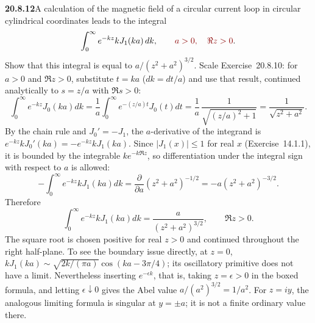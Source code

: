 \par\bigskip
\noindent\textbf{20.8.12}\quad A calculation of the magnetic field
of a circular current loop in circular cylindrical coordinates
leads to the integral
\[
\int_{0}^{\infty}e^{-kz}kJ_{1}(ka)\,dk,\qquad\erratum{a>0,\quad\Re z>0}.
\]
Show that this integral is equal to $a/(z^{2}+a^{2})^{3/2}$.
\solution
{}
Scale Exercise~20.8.10: for $a>0$ and $\Re z>0$, substitute
$t=ka$ ($dk=dt/a$) and use that result, continued
analytically to $s=z/a$ with $\Re s>0$:
\[
\int_0^\infty e^{-kz}J_0(ka)dk
=\frac1a\int_0^\infty e^{-(z/a)t}J_0(t)dt
=\frac1a\,\frac1{\sqrt{(z/a)^2+1}}
=\frac1{\sqrt{z^2+a^2}}.
\]
By the chain rule and $J_0'=-J_1$, the $a$-derivative of the
integrand is $e^{-kz}kJ_0'(ka)=-e^{-kz}kJ_1(ka)$. Since
$|J_1(x)|\le1$ for real $x$ (Exercise~14.1.1), it is bounded
by the integrable $ke^{-k\Re z}$, so differentiation under the
integral sign with respect to $a$ is allowed:
\[
-\int_0^\infty e^{-kz}kJ_1(ka)dk
=\frac\partial{\partial a}(z^2+a^2)^{-1/2}
=-a(z^2+a^2)^{-3/2}.
\]
Therefore
\[
\boxed{\int_0^\infty e^{-kz}kJ_1(ka)dk
=\frac a{(z^2+a^2)^{3/2}}},\qquad \Re z>0.
\]
The square root is chosen positive for real $z>0$ and
continued throughout the right half-plane. To see the
boundary issue directly, at $z=0$,
$kJ_1(ka)\sim\sqrt{2k/(\pi a)}\cos(ka-3\pi/4)$;
its oscillatory primitive does not have a limit.
Nevertheless inserting $e^{-\epsilon k}$, that is, taking
$z=\epsilon>0$ in the boxed formula, and letting
$\epsilon\downarrow0$ gives the Abel value $a/(a^2)^{3/2}=1/a^2$.
For $z=iy$, the analogous limiting formula is singular at
$y=\pm a$; it is not a finite ordinary value there.

